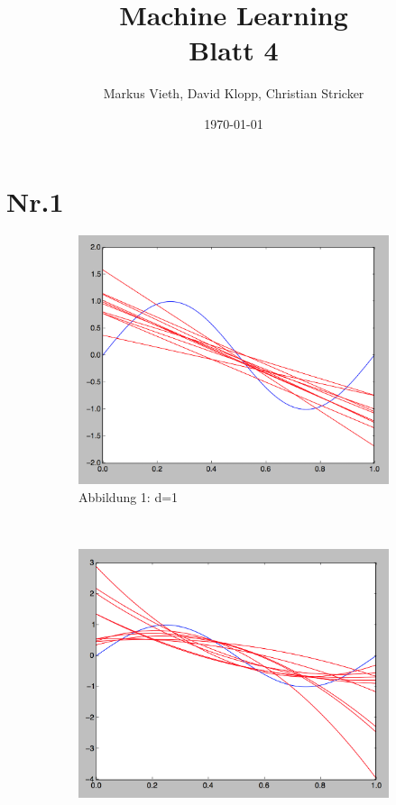 \documentclass[a4paper,11pt,twoside]{article}
\title{Machine Learning\\ Blatt 4}
\author{Markus Vieth, David Klopp, Christian Stricker}
\date{\today}
\begin{document}
\newcommand{\cor}[1]{\textcolor{red}{\textit{#1}}}
\maketitle
\cleardoublepage
\pagestyle{myheadings}

\newpage

\section*{Nr.1}
\begin{figure}[h]
	\captionsetup[subfigure]{labelformat=empty}
	\centering
	\begin{subfigure}[t]{0.33\textwidth}
		\includegraphics[width=\textwidth]{images/Nr_1/d_1.png}
		\caption{Abbildung 1: d=1}
	\end{subfigure}%
	~
	\begin{subfigure}[t]{0.33\textwidth}
		\includegraphics[width=\textwidth]{images/Nr_1/d_2.png}

\end{subfigure}
\end{figure}
\end{document}
